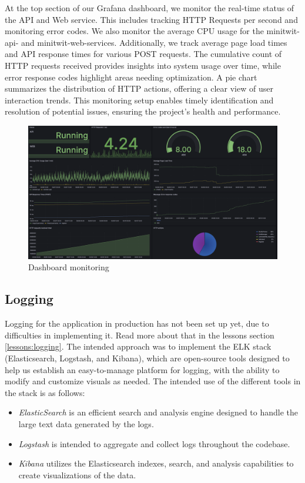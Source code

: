 At the top section of our Grafana dashboard, we monitor the real-time status of the API and Web service. This includes tracking HTTP Requests per second and monitoring error codes. We also monitor the average CPU usage for the minitwit-api- and minitwit-web-services. Additionally, we track average page load times and API response times for various POST requests. The cumulative count of HTTP requests received provides insights into system usage over time, while error response codes highlight areas needing optimization. A pie chart summarizes the distribution of HTTP actions, offering a clear view of user interaction trends. This monitoring setup enables timely identification and resolution of potential issues, ensuring the project's health and performance.
\begin{figure}[H]
  \centering
  \includegraphics[width=\textwidth]{Images/Dashboard.png}
  \caption{Dashboard monitoring}
  \label{fig:dashboard}
\end{figure}

\subsection{Logging}
Logging for the application in production has not been set up yet, due to difficulties in implementing it. Read more about that in the lessons section \ref{lessons:logging}. The intended approach was to implement the ELK stack (Elasticsearch, Logstash, and Kibana), which are open-source tools designed to help us establish an easy-to-manage platform for logging, with the ability to modify and customize visuals as needed. The intended use of the different tools in the stack is as follows:
\begin{itemize}
    \item \textit{ElasticSearch} is an efficient search and analysis engine designed to handle the large text data generated by the logs.
    \item \textit{Logstash} is intended to aggregate and collect logs throughout the codebase.
    \item \textit{Kibana} utilizes the Elasticsearch indexes, search, and analysis capabilities to create visualizations of the data.
\end{itemize}

